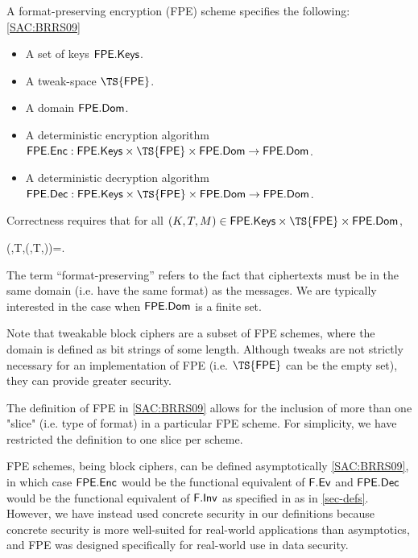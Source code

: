 
A format-preserving encryption (FPE) scheme specifies the following: \ref{SAC:BRRS09}
\begin{itemize}
	\item A set of keys $\mathsf{FPE}.\mathsf{Keys}$.
	\item A tweak-space $\TS{\FPE}$.
	\item A domain $\mathsf{FPE}.\mathsf{Dom}$.
	\item A deterministic encryption algorithm $\Enc{\FPE}:\Keys{\FPE}\cross\TS{\FPE}\cross\Dom{\FPE}\to\Dom{\FPE}$.
	\item A deterministic decryption algorithm $\Dec{\FPE}:\Keys{\FPE}\cross\TS{\FPE}\cross\Dom{\FPE}\to\Dom{\FPE}$.
\end{itemize}
Correctness requires that for all $(\key,T,\msg)\in\Keys{\FPE}\cross\TS{\FPE}\cross\Dom{\FPE}$,
\begin{newmath}
	\Dec{\FPE}(\key,T,\Enc{\FPE}(\key,T,\msg))=\msg.
\end{newmath}

The term ``format-preserving'' refers to the fact that ciphertexts must be in the same domain (i.e. have the same format) as the messages. We are typically interested in the case when $\mathsf{FPE}.\mathsf{Dom}$ is a finite set.

Note that tweakable block ciphers are a subset of FPE schemes, where the domain is defined as bit strings of some length. Although tweaks are not strictly necessary for an implementation of FPE (i.e. $\TS{\FPE}$ can be the empty set), they can provide greater security. \

The definition of FPE in \ref{SAC:BRRS09} allows for the inclusion of more than one "slice" (i.e. type of format) in a particular FPE scheme. For simplicity, we have restricted the definition to one slice per scheme. \

FPE schemes, being block ciphers, can be defined asymptotically \ref{SAC:BRRS09}, in which case $\mathsf{FPE}.\mathsf{Enc}$ would be the functional equivalent of $\mathsf{F}.\mathsf{Ev}$ and $\mathsf{FPE}.\mathsf{Dec}$ would be the functional equivalent of $\mathsf{F}.\mathsf{Inv}$ as specified in as in \ref{sec-defs}. However, we have instead used concrete security in our definitions because concrete security is more well-suited for real-world applications than asymptotics, and FPE was designed specifically for real-world use in data security.